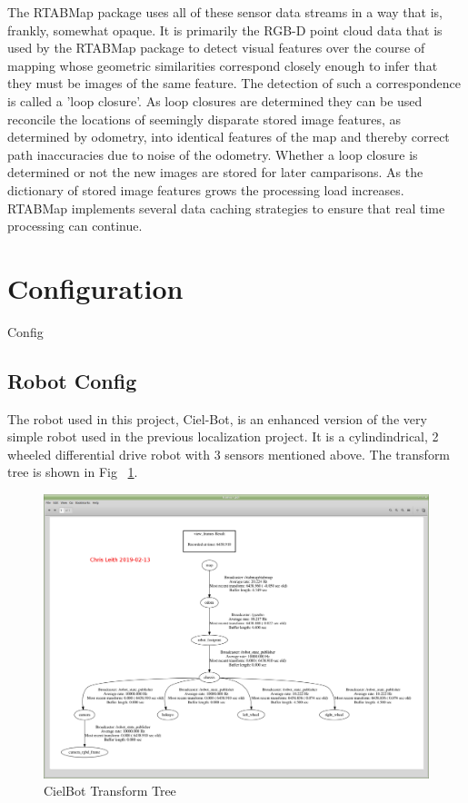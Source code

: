 \documentclass[10pt,journal,compsoc]{IEEEtran}
\begin{document}
The RTABMap package uses all of these sensor data streams in a way that is, frankly, somewhat opaque. It is primarily the RGB-D point cloud data that is used by the RTABMap package to detect visual features over the course of mapping whose geometric similarities correspond closely enough to infer that they must be images of the same feature. The detection of such a correspondence is called a 'loop closure'. As loop closures are determined they can be used reconcile the locations of seemingly disparate stored image features, as determined by odometry, into identical features of the map and thereby correct path inaccuracies due to noise of the odometry. Whether a loop closure is determined or not the new images are stored for later camparisons. As the dictionary of stored image features grows the processing load increases. RTABMap implements several data caching strategies to ensure that real time processing can continue.


\section{Configuration}
Config 

\subsection{Robot Config}
The robot used in this project, Ciel-Bot, is an enhanced version of the very simple robot used in the previous localization project. It is a cylindindrical, 2 wheeled differential drive robot with 3 sensors mentioned above.
The transform tree is shown in Fig ~\ref{fig:tftree}.

\begin{figure}[h]
      \centering
      \includegraphics[width=\linewidth]{Assets/Frames1_ScreenShot_2019-02-12_16-25-23.png}
      \caption{CielBot Transform Tree}
      \label{fig:tftree}
\end{figure}
\end{document}
